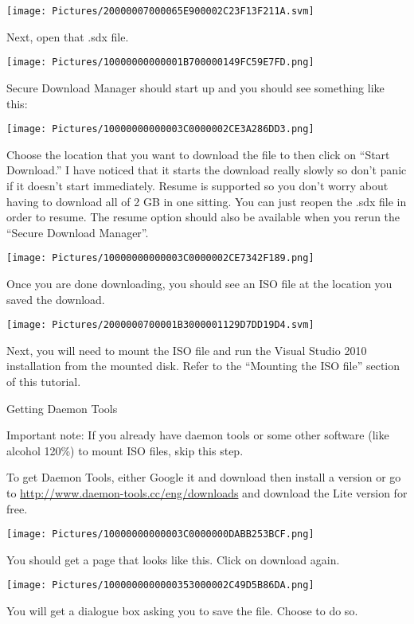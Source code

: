 \documentclass[
]{article}
\begin{document}
\texttt{[image: Pictures/20000007000065E900002C23F13F211A.svm]}

Next, open that .sdx file.

\texttt{[image: Pictures/10000000000001B700000149FC59E7FD.png]}

Secure Download Manager should start up and you should see something
like this:

\texttt{[image: Pictures/10000000000003C0000002CE3A286DD3.png]}

Choose the location that you want to download the file to then click on
``Start Download.'' I have noticed that it starts the download really
slowly so don't panic if it doesn't start immediately. Resume is
supported so you don't worry about having to download all of 2 GB in one
sitting. You can just reopen the .sdx file in order to resume. The
resume option should also be available when you rerun the ``Secure
Download Manager''.

\texttt{[image: Pictures/10000000000003C0000002CE7342F189.png]}

Once you are done downloading, you should see an ISO file at the
location you saved the download.

\texttt{[image: Pictures/2000000700001B3000001129D7DD19D4.svm]}

Next, you will need to mount the ISO file and run the Visual Studio 2010
installation from the mounted disk. Refer to the ``Mounting the ISO
file'' section of this tutorial.

Getting Daemon Tools

Important note: If you already have daemon tools or some other software
(like alcohol 120\%) to mount ISO files, skip this step.

To get Daemon Tools, either Google it and download then install a
version or go to \url{http://www.daemon-tools.cc/eng/downloads} and
download the Lite version for free.

\texttt{[image: Pictures/10000000000003C0000000DABB253BCF.png]}

You should get a page that looks like this. Click on download again.

\texttt{[image: Pictures/1000000000000353000002C49D5B86DA.png]}

You will get a dialogue box asking you to save the file. Choose to do
so.
\end{document}
